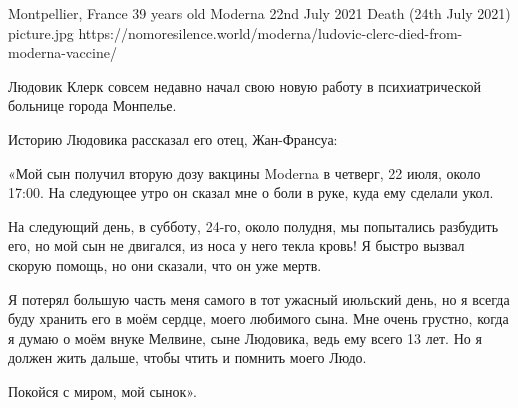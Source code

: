 {Montpellier, France}
{39 years old}
{Moderna}
{22nd July 2021}
{Death (24th July 2021)}
{picture.jpg}
{https://nomoresilence.world/moderna/ludovic-clerc-died-from-moderna-vaccine/}
{

Людовик Клерк совсем недавно начал свою новую работу в психиатрической больнице
города Монпелье.

Историю Людовика рассказал его отец, Жан-Франсуа:

«Мой сын получил вторую дозу вакцины Moderna в четверг, 22 июля, около 17:00. На
следующее утро он сказал мне о боли в руке, куда ему сделали укол.

На следующий день, в субботу, 24-го, около полудня, мы попытались разбудить его,
но мой сын не двигался, из носа у него текла кровь! Я быстро вызвал скорую
помощь, но они сказали, что он уже мертв.

Я потерял большую часть меня самого в тот ужасный июльский день, но я всегда
буду хранить его в моём сердце, моего любимого сына. Мне очень грустно, когда я
думаю о моём внуке Мелвине, сыне Людовика, ведь ему всего 13 лет. Но я должен
жить дальше, чтобы чтить и помнить моего Людо.

Покойся с миром, мой сынок».

}
